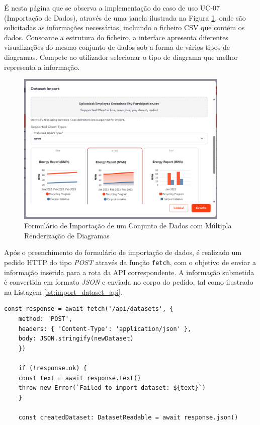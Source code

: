 É nesta página que se observa a implementação do caso de uso UC-07 (Importação de Dados), através de uma janela ilustrada na Figura \ref{fig:create_dataset}, onde são solicitadas as informações necessárias, incluindo o ficheiro CSV que contém os dados. Consoante a estrutura do ficheiro, a interface apresenta diferentes visualizações do mesmo conjunto de dados sob a forma de vários tipos de diagramas. Compete ao utilizador selecionar o tipo de diagrama que melhor representa a informação.

\begin{figure}[H]
    \centering
    \includegraphics[width=4in,keepaspectratio]{frontmatter/assets/platform_prints/dataset/dataset_import.png}
    \caption{Formulário de Importação de um Conjunto de Dados com Múltipla Renderização de Diagramas}
    \label{fig:create_dataset}
\end{figure}

Após o preenchimento do formulário de importação de dados, é realizado um pedido HTTP do tipo \textit{POST} através da função \texttt{fetch}, com o objetivo de enviar a informação inserida para a rota da API correspondente. A informação submetida é convertida em formato \textit{JSON} e enviada no corpo do pedido, tal como ilustrado na Listagem \ref{lst:import_dataset_api}.

\begin{lstlisting}[style=customts, caption={Chamada à API de Importação de um Conjunto de Dados}, label={lst:import_dataset_api}]
    const response = await fetch('/api/datasets', {
    method: 'POST',
    headers: { 'Content-Type': 'application/json' },
    body: JSON.stringify(newDataset)
    })

    if (!response.ok) {
    const text = await response.text()
    throw new Error(`Failed to import dataset: ${text}`)
    }
    
    const createdDataset: DatasetReadable = await response.json()
\end{lstlisting}

